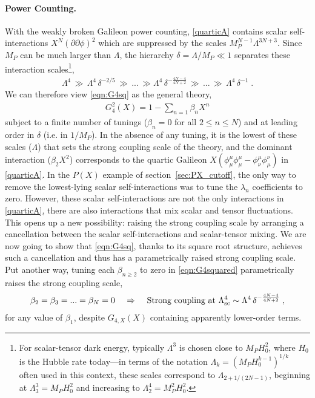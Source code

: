 \documentclass[11pt]{article}
\begin{document}
\paragraph{Power Counting.}
With the weakly broken Galileon power counting, \eqref{quarticA} contains scalar self-interactions $X^N (\partial \partial \phi)^2$ which are suppressed by the scales $M_P^{N-1} \Lambda^{3N+3}$. 
Since $M_P$ can be much larger than $\Lambda$, the hierarchy $\delta = \Lambda/M_P \ll 1$ separates these interaction scales\footnote{
For scalar-tensor dark energy, typically $\Lambda^3$ is chosen close to $M_P H_0^2$, where $H_0$ is the  Hubble rate today---in terms of the notation $\Lambda_k = \left( M_P H_0^{k-1} \right)^{1/k}$ often used in this context, these scales correspond to $\Lambda_{2 + 1/(2N-1)}$, beginning at $\Lambda_3^3 = M_P H_0^2$ and increasing to $\Lambda_2^4 = M_P^2 H_0^2$. 
},
\begin{align}
\Lambda^4  \, \gg \,  \Lambda^4 \, \delta^{-2/5} \, \gg \,   ... \,  \gg   \Lambda^4 \, \delta^{- \frac{4N-4}{4N+2}}   \, \gg \,   ... \,  \gg \,   \Lambda^4 \, \delta^{-1}  \; . 
\end{align}
We can therefore view \eqref{eqn:G4sq} as the general theory,
\begin{align}
 G_4^2 (X) = 1 - \sum_{n=1} \beta_n X^n 
 \label{eqn:G4squared}
\end{align}
subject to a finite number of tunings ($\beta_n = 0$ for all $2 \leq n \leq N$) and at leading order in $\delta$ (i.e. in $1/M_P$). 
In the absence of any tuning, it is the lowest of these scales ($\Lambda$) that sets the strong coupling scale of the theory, and the dominant interaction ($\beta_2 X^2$) corresponds to the quartic Galileon $X ( \phi^\mu_\mu \phi^\mu_\mu - \phi^\mu_\nu \phi^\nu_\mu )$ in \eqref{quarticA}. 
In the $P(X)$ example of section~\ref{sec:PX_cutoff}, the only way to remove the lowest-lying scalar self-interactions was to tune the $\lambda_n$ coefficients to zero. 
However, these scalar self-interactions are not the only interactions in \eqref{quarticA}, there are also interactions that mix scalar and tensor fluctuations. This opens up a new possibility: raising the strong coupling scale by arranging a cancellation between the scalar self-interactions and scalar-tensor mixing. We are now going to show that \eqref{eqn:G4sq}, thanks to its square root structure, achieves such a cancellation and thus has a parametrically raised strong coupling scale.
Put another way, tuning each $\beta_{n \geq 2}$ to zero in \eqref{eqn:G4squared} parametrically raises the strong coupling scale, 
\begin{align}
 \beta_2 = \beta_3 = ... = \beta_{N} = 0 \;\;\;\; \Rightarrow \;\;\;\; \text{Strong coupling at } \Lambda_{\rm sc}^4 \sim  \Lambda^4 \, \delta^{- \frac{4N-4}{4N+2}}   \; ,
 \label{eqn:G4Raise}
\end{align}
for any value of $\beta_1$, despite $G_{4,X} (X)$ containing apparently lower-order terms.  
\end{document}
